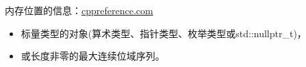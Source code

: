 内存位置的信息：\href{http://en.cppreference.com/w/cpp/language/memory_model}{cppreference.com}

\begin{itemize}
\item 
标量类型的对象(算术类型、指针类型、枚举类型或std::nullptr\_t)，

\item 
或长度非零的最大连续位域序列。
\end{itemize}











